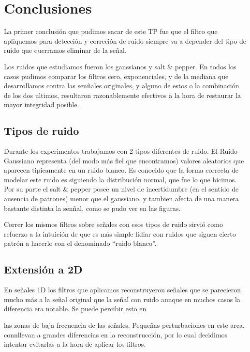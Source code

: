 \section{Conclusiones}

La primer conclusi\'on que pudimos sacar de este TP fue que el filtro que apliquemos para detecci\'on y correci\'on
de ruido siempre va a depender del tipo de ruido que querramos eliminar de la se\~nal.

Los ruidos que estudiamos fueron los gaussianos  y salt \& pepper. En todos los casos pudimos comparar los filtros
cero, exponenciales, y de la mediana que desarrollamos contra las sen\~nales originales, y alguno de estos o
la combinaci\'on de los dos ultimos, resultaron razonablemente efectivos a la hora de restaurar la mayor integridad posible.

\subsection{Tipos de ruido}

Durante los experimentos trabajamos con 2 tipos diferentes de ruido. 
El  Ruido Gaussiano representa (del modo m\'as fiel que encontramos) valores aleatorios  que aparecen tipicamente en
un ruido blanco. Es conocido que la forma correcta de modelar este ruido es siguiendo la distribuci\'on normal,
que fue lo que hicimos.
Por su parte el salt \& pepper posee un nivel de incertidumbre (en el sentido de ausencia de patrones)
menor que el gaussiano, y tambien afecta de una manera bastante distinta la sen\~nal, como se pudo ver en las
figuras.

Correr los mismos filtros sobre se\~nales con esos tipos de ruido sirvi\'o como
refuerzo a la intuici\'on de que es m\'as simple lidiar con ruidos que siguen
cierto patr\'on a hacerlo con el denominado ``ruido blanco''.

\subsection{Extensi\'on a 2D}

En se\~nales 1D los filtros que aplicamos reconstruyeron se\~nales que se parecieron mucho m\'as a la se\~nal
original que la se\~nal con ruido aunque en muchos casos la diferencia era notable. Se puede percibir esto en 

las zonas de baja frecuencia de las se\~nales. Peque\~nas perturbaciones en este area, connllevan a grandes 
diferencias en la reconstrucci\'on, por lo cual decidimos intentar evitarlas a la hora de aplicar los filtros.

